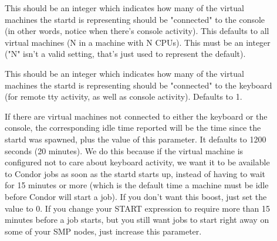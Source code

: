 \begin{description}

\item[] 
\label{param:VirtualMachinesConnectedToConsole}
  This should be an integer which indicates how many of the virtual
  machines the startd is representing should be "connected" to the
  console (in other words, notice when there's console activity).
  This defaults to all virtual machines (N in a machine with N CPUs).
  This must be an integer ("N" isn't a valid setting, that's just used
  to represent the default).

\item[]
\label{param:VirtualMachinesConnectedToKeyboard}
  This should be an integer which indicates how many of the virtual
  machines the startd is representing should be "connected" to the
  keyboard (for remote tty activity, as well as console activity).
  Defaults to 1.

\item[]
\label{param:DisconnectedKeyboardIdleBoost}
  If there are virtual machines not connected to either the keyboard
  or the console, the corresponding idle time reported will be the
  time since the startd was spawned, plus the value of this parameter.
  It defaults to 1200 seconds (20 minutes). 
  We do this because if the virtual machine is configured not to care
  about keyboard activity, we want it to be available to Condor jobs
  as soon as the startd starts up, instead of having to wait for 15
  minutes or more (which is the default time a machine must be idle
  before Condor will start a job).
  If you don't want this boost, just set the value to 0.  
  If you change your START expression to require more than 15 minutes
  before a job starts, but you still want jobs to start right away on
  some of your SMP nodes, just increase this parameter.

\end{description}
